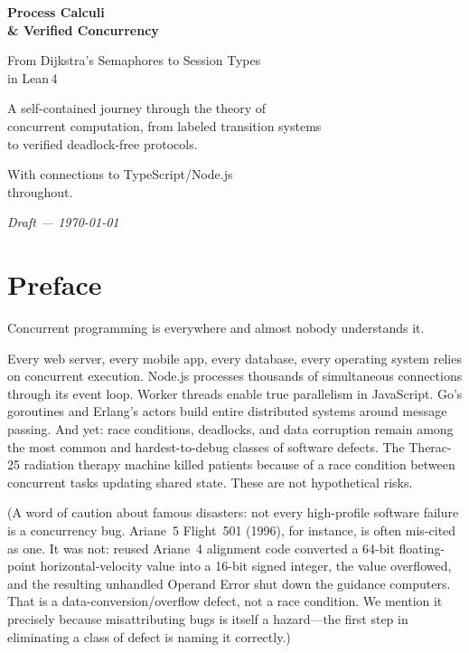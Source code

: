 \documentclass[11pt, a4paper, oneside]{book}
\begin{document}
\begin{titlepage}
\centering
\vspace*{3cm}
{\Huge\bfseries\color{deepblue} Process Calculi\\[0.3cm]
\& Verified Concurrency\par}
\vspace{1cm}
{\Large\color{midblue} From Dijkstra's Semaphores to Session Types\\[0.2cm]
in Lean\,4\par}
\vspace{2cm}
{\large A self-contained journey through the theory of\\
concurrent computation, from labeled transition systems\\
to verified deadlock-free protocols.\par}
\vspace{1cm}
{\normalsize With connections to TypeScript/Node.js\\
throughout.\par}
\vspace{3cm}
{\large\itshape Draft --- \today\par}
\vfill
\end{titlepage}

\frontmatter
\tableofcontents

\chapter*{Preface}

Concurrent programming is everywhere and almost nobody understands it.

Every web server, every mobile app, every database, every operating system
relies on concurrent execution. Node.js processes thousands of simultaneous
connections through its event loop. Worker threads enable true parallelism in
JavaScript. Go's goroutines and Erlang's actors build entire distributed
systems around message passing. And yet: race conditions, deadlocks, and
data corruption remain among the most common and hardest-to-debug classes of
software defects. The Therac-25 radiation therapy machine killed patients
because of a race condition between concurrent tasks updating shared
state. These are not hypothetical risks.

(A word of caution about famous disasters: not every high-profile software
failure is a concurrency bug. Ariane~5 Flight~501 (1996), for instance, is
often mis-cited as one. It was not: reused Ariane~4 alignment code converted
a 64-bit floating-point horizontal-velocity value into a 16-bit signed
integer, the value overflowed, and the resulting unhandled Operand Error
shut down the guidance computers. That is a data-conversion/overflow defect,
not a race condition. We mention it precisely because misattributing bugs is
itself a hazard---the first step in eliminating a class of defect is naming
it correctly.)
\end{document}
